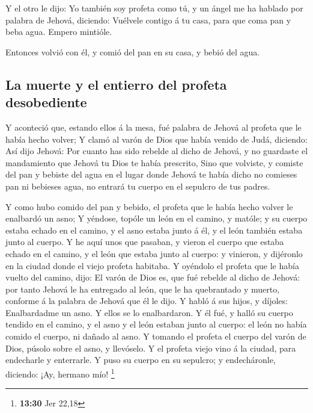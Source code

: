  Y el otro le dijo: Yo también soy profeta como tú, y un
ángel me ha hablado por palabra de Jehová, diciendo: Vuélvele contigo á
tu casa, para que coma pan y beba agua. Empero mintióle.

 Entonces volvió con él, y comió del pan en su casa, y
bebió del agua.

\hypertarget{la-muerte-y-el-entierro-del-profeta-desobediente}{%
\subsection{La muerte y el entierro del profeta
desobediente}\label{la-muerte-y-el-entierro-del-profeta-desobediente}}

 Y aconteció que, estando ellos á la mesa, fué palabra de
Jehová al profeta que le había hecho volver;  Y clamó al
varón de Dios que había venido de Judá, diciendo: Así dijo Jehová: Por
cuanto has sido rebelde al dicho de Jehová, y no guardaste el
mandamiento que Jehová tu Dios te había prescrito,  Sino
que volviste, y comiste del pan y bebiste del agua en el lugar donde
Jehová te había dicho no comieses pan ni bebieses agua, no entrará tu
cuerpo en el sepulcro de tus padres.

 Y como hubo comido del pan y bebido, el profeta que le
había hecho volver le enalbardó un asno;  Y yéndose, topóle
un león en el camino, y matóle; y su cuerpo estaba echado en el camino,
y el asno estaba junto á él, y el león también estaba junto al cuerpo.
 Y he aquí unos que pasaban, y vieron el cuerpo que estaba
echado en el camino, y el león que estaba junto al cuerpo: y vinieron, y
dijéronlo en la ciudad donde el viejo profeta habitaba.  Y
oyéndolo el profeta que le había vuelto del camino, dijo: El varón de
Dios es, que fué rebelde al dicho de Jehová: por tanto Jehová le ha
entregado al león, que le ha quebrantado y muerto, conforme á la palabra
de Jehová que él le dijo.  Y habló á sus hijos, y díjoles:
Enalbardadme un asno. Y ellos se lo enalbardaron.  Y él
fué, y halló su cuerpo tendido en el camino, y el asno y el león estaban
junto al cuerpo: el león no había comido el cuerpo, ni dañado al asno.
 Y tomando el profeta el cuerpo del varón de Dios, púsolo
sobre el asno, y llevóselo. Y el profeta viejo vino á la ciudad, para
endecharle y enterrarle.  Y puso su cuerpo en su sepulcro;
y endecháronle, diciendo: ¡Ay, hermano mío! \footnote{\textbf{13:30} Jer
  22,18}

